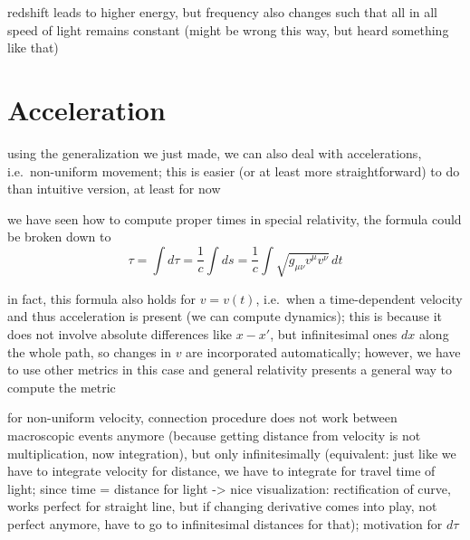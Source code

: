 redshift leads to higher energy, but frequency also changes such that all in all speed of light remains constant (might be wrong this way, but heard something like that)



\newpage



	\section{Acceleration}%
using the generalization we just made, we can also deal with accelerations, i.e.~non-uniform movement; this is easier (or at least more straightforward) to do than intuitive version, at least for now


we have seen how to compute proper times in special relativity, the formula could be broken down to 
\begin{equation}
\tau = \int d\tau = \frac{1}{c} \int ds = \frac{1}{c} \int \sqrt{g_{\mu \nu} v^\mu v^\nu} \, dt
\end{equation}

in fact, this formula also holds for $v = v(t)$, i.e.~when a time-dependent velocity and thus acceleration is present (we can compute dynamics); this is because it does not involve absolute differences like $x - x'$, but infinitesimal ones $dx$ along the whole path, so changes in $v$ are incorporated automatically; however, we have to use other metrics in this case and general relativity presents a general way to compute the metric




for non-uniform velocity, connection procedure does not work between macroscopic events anymore (because getting distance from velocity is not multiplication, now integration), but only infinitesimally (equivalent: just like we have to integrate velocity for distance, we have to integrate for travel time of light; since time = distance for light -> nice visualization: rectification of curve, works perfect for straight line, but if changing derivative comes into play, not perfect anymore, have to go to infinitesimal distances for that); motivation for $d\tau$




